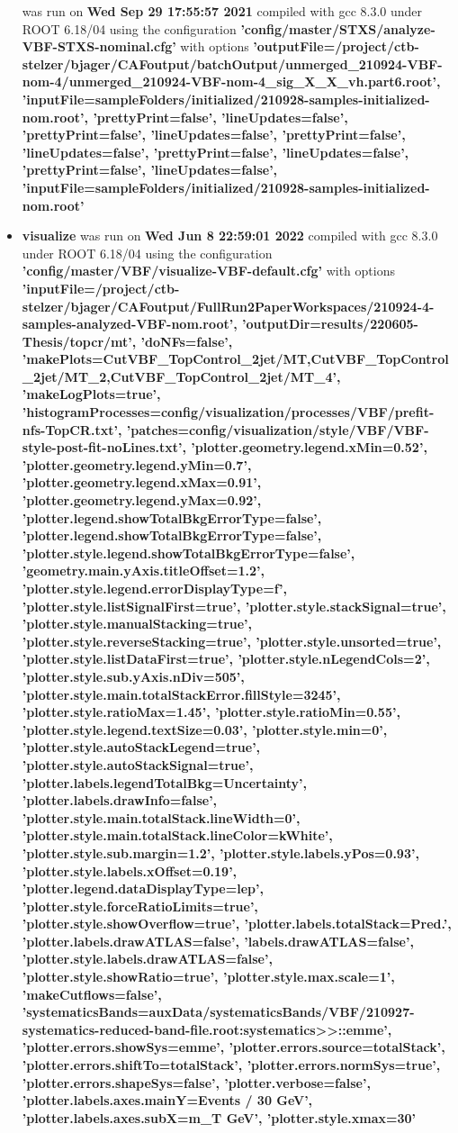\documentclass{article}
\begin{document}
\begin{itemize}
was run on \textbf{Wed Sep 29 17:55:57 2021} compiled with gcc 8.3.0 under ROOT 6.18/04 using the configuration \textbf{'config/master/STXS/analyze-VBF-STXS-nominal.cfg'} with options \textbf{'outputFile=/project/ctb-stelzer/bjager/CAFoutput/batchOutput/unmerged\_210924-VBF-nom-4/unmerged\_210924-VBF-nom-4\_sig\_X\_X\_vh.part6.root', 'inputFile=sampleFolders/initialized/210928-samples-initialized-nom.root', 'prettyPrint=false', 'lineUpdates=false', 'prettyPrint=false', 'lineUpdates=false', 'prettyPrint=false', 'lineUpdates=false', 'prettyPrint=false', 'lineUpdates=false', 'prettyPrint=false', 'lineUpdates=false', 'inputFile=sampleFolders/initialized/210928-samples-initialized-nom.root'} \item \textbf{visualize} was run on \textbf{Wed Jun  8 22:59:01 2022} compiled with gcc 8.3.0 under ROOT 6.18/04 using the configuration \textbf{'config/master/VBF/visualize-VBF-default.cfg'} with options \textbf{'inputFile=/project/ctb-stelzer/bjager/CAFoutput/FullRun2PaperWorkspaces/210924-4-samples-analyzed-VBF-nom.root', 'outputDir=results/220605-Thesis/topcr/mt', 'doNFs=false', 'makePlots=CutVBF\_TopControl\_2jet/MT,CutVBF\_TopControl\_2jet/MT\_2,CutVBF\_TopControl\_2jet/MT\_4', 'makeLogPlots=true', 'histogramProcesses=config/visualization/processes/VBF/prefit-nfs-TopCR.txt', 'patches=config/visualization/style/VBF/VBF-style-post-fit-noLines.txt', 'plotter.geometry.legend.xMin=0.52', 'plotter.geometry.legend.yMin=0.7', 'plotter.geometry.legend.xMax=0.91', 'plotter.geometry.legend.yMax=0.92', 'plotter.legend.showTotalBkgErrorType=false', 'plotter.legend.showTotalBkgErrorType=false', 'plotter.style.legend.showTotalBkgErrorType=false', 'geometry.main.yAxis.titleOffset=1.2', 'plotter.style.legend.errorDisplayType=f', 'plotter.style.listSignalFirst=true', 'plotter.style.stackSignal=true', 'plotter.style.manualStacking=true', 'plotter.style.reverseStacking=true', 'plotter.style.unsorted=true', 'plotter.style.listDataFirst=true', 'plotter.style.nLegendCols=2', 'plotter.style.sub.yAxis.nDiv=505', 'plotter.style.main.totalStackError.fillStyle=3245', 'plotter.style.ratioMax=1.45', 'plotter.style.ratioMin=0.55', 'plotter.style.legend.textSize=0.03', 'plotter.style.min=0', 'plotter.style.autoStackLegend=true', 'plotter.style.autoStackSignal=true', 'plotter.labels.legendTotalBkg=Uncertainty', 'plotter.labels.drawInfo=false', 'plotter.style.main.totalStack.lineWidth=0', 'plotter.style.main.totalStack.lineColor=kWhite', 'plotter.style.sub.margin=1.2', 'plotter.style.labels.yPos=0.93', 'plotter.style.labels.xOffset=0.19', 'plotter.legend.dataDisplayType=lep', 'plotter.style.forceRatioLimits=true', 'plotter.style.showOverflow=true', 'plotter.labels.totalStack=Pred.', 'plotter.labels.drawATLAS=false', 'labels.drawATLAS=false', 'plotter.style.labels.drawATLAS=false', 'plotter.style.showRatio=true', 'plotter.style.max.scale=1', 'makeCutflows=false', 'systematicsBands=auxData/systematicsBands/VBF/210927-systematics-reduced-band-file.root:systematics>>::emme', 'plotter.errors.showSys=emme', 'plotter.errors.source=totalStack', 'plotter.errors.shiftTo=totalStack', 'plotter.errors.normSys=true', 'plotter.errors.shapeSys=false', 'plotter.verbose=false', 'plotter.labels.axes.mainY=Events / 30 GeV', 'plotter.labels.axes.subX=m\_{T} GeV', 'plotter.style.xmax=30'} \end{itemize}
\end{document}
